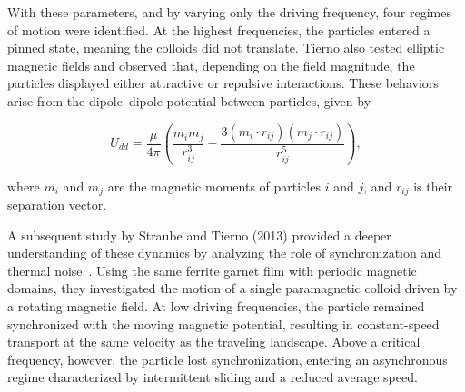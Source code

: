 With these parameters, and by varying only the driving frequency, four regimes of motion were identified. At the highest frequencies, the particles entered a pinned state, meaning the colloids did not translate. Tierno also tested elliptic magnetic fields and observed that, depending on the field magnitude, the particles displayed either attractive or repulsive interactions. These behaviors arise from the dipole–dipole potential between particles, given by

\begin{equation}
U_{dd} = \frac{\mu}{4\pi} \left( \frac{m_i m_j}{r^3_{ij}} - \frac{3(m_i \cdot r_{ij})(m_j \cdot r_{ij})}{r^5_{ij}} \right),
\label{eq:dipolepairpotential}
\end{equation}

where $m_i$ and $m_j$ are the magnetic moments of particles $i$ and $j$, and $r_{ij}$ is their separation vector.

A subsequent study by Straube and Tierno (2013) provided a deeper understanding of these dynamics by analyzing the role of synchronization and thermal noise~\cite{straube2013synchronous}. Using the same ferrite garnet film with periodic magnetic domains, they investigated the motion of a single paramagnetic colloid driven by a rotating magnetic field. At low driving frequencies, the particle remained synchronized with the moving magnetic potential, resulting in constant-speed transport at the same velocity as the traveling landscape. Above a critical frequency, however, the particle lost synchronization, entering an asynchronous regime characterized by intermittent sliding and a reduced average speed.

